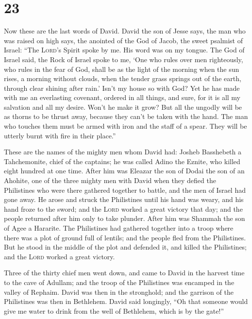 \hypertarget{section-22}{%
\section{23}\label{section-22}}

 Now these are the last words of David. David the son of
Jesse says, the man who was raised on high says, the anointed of the God
of Jacob, the sweet psalmist of Israel:  ``The
\textsc{Lord}'s Spirit spoke by me. His word was on my tongue.
 The God of Israel said, the Rock of Israel spoke to me,
`One who rules over men righteously, who rules in the fear of God,
 shall be as the light of the morning when the sun rises,
a morning without clouds, when the tender grass springs out of the
earth, through clear shining after rain.'  Isn't my house
so with God? Yet he has made with me an everlasting covenant, ordered in
all things, and sure, for it is all my salvation and all my desire.
Won't he make it grow?  But all the ungodly will be as
thorns to be thrust away, because they can't be taken with the hand.
 The man who touches them must be armed with iron and the
staff of a spear. They will be utterly burnt with fire in their place.''

 These are the names of the mighty men whom David had:
Josheb Basshebeth a Tahchemonite, chief of the captains; he was called
Adino the Eznite, who killed eight hundred at one time. 
After him was Eleazar the son of Dodai the son of an Ahohite, one of the
three mighty men with David when they defied the Philistines who were
there gathered together to battle, and the men of Israel had gone away.
 He arose and struck the Philistines until his hand was
weary, and his hand froze to the sword; and the \textsc{Lord} worked a
great victory that day; and the people returned after him only to take
plunder.  After him was Shammah the son of Agee a
Hararite. The Philistines had gathered together into a troop where there
was a plot of ground full of lentils; and the people fled from the
Philistines.  But he stood in the middle of the plot and
defended it, and killed the Philistines; and the \textsc{Lord} worked a
great victory.

 Three of the thirty chief men went down, and came to
David in the harvest time to the cave of Adullam; and the troop of the
Philistines was encamped in the valley of Rephaim.  David
was then in the stronghold; and the garrison of the Philistines was then
in Bethlehem.  David said longingly, ``Oh that someone
would give me water to drink from the well of Bethlehem, which is by the
gate!''

